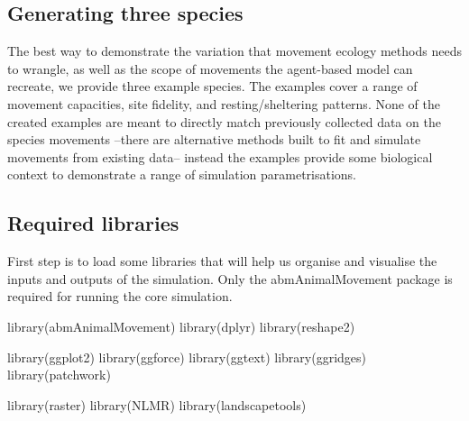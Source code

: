 \documentclass[10pt,a4paper]{article}
\newenvironment{Shaded}{}{}
\newcommand{\FunctionTok}[1]{#1}
\newcommand{\NormalTok}[1]{#1}
\begin{document}
\hypertarget{generating-three-species}{%
\subsection{Generating three species}\label{generating-three-species}}

The best way to demonstrate the variation that movement ecology methods needs to wrangle, as well as the scope of movements the agent-based model can recreate, we provide three example species.
The examples cover a range of movement capacities, site fidelity, and resting/sheltering patterns.
None of the created examples are meant to directly match previously collected data on the species movements --there are alternative methods built to fit and simulate movements from existing data-- instead the examples provide some biological context to demonstrate a range of simulation parametrisations.

\hypertarget{required-libraries}{%
\subsection{Required libraries}\label{required-libraries}}

First step is to load some libraries that will help us organise and visualise the inputs and outputs of the simulation.
Only the abmAnimalMovement package is required for running the core simulation.

\begin{Shaded}
\begin{Highlighting}[]
\FunctionTok{library}\NormalTok{(abmAnimalMovement)}
\FunctionTok{library}\NormalTok{(dplyr)}
\FunctionTok{library}\NormalTok{(reshape2)}

\FunctionTok{library}\NormalTok{(ggplot2)}
\FunctionTok{library}\NormalTok{(ggforce)}
\FunctionTok{library}\NormalTok{(ggtext)}
\FunctionTok{library}\NormalTok{(ggridges)}
\FunctionTok{library}\NormalTok{(patchwork)}

\FunctionTok{library}\NormalTok{(raster)}
\FunctionTok{library}\NormalTok{(NLMR)}
\FunctionTok{library}\NormalTok{(landscapetools)}
\end{Highlighting}
\end{Shaded}
\end{document}
